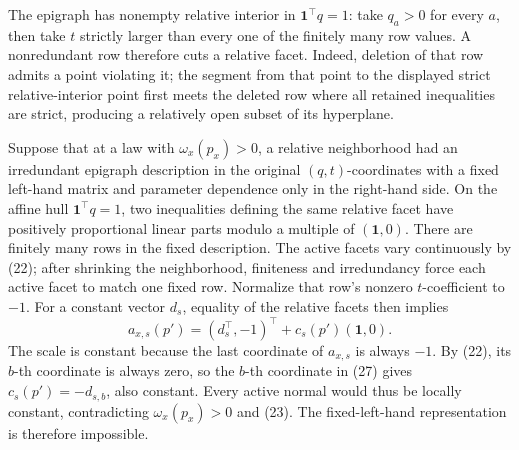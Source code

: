 The epigraph has nonempty relative interior in
\(\mathbf 1^\top q=1\): take \(q_a>0\) for every \(a\), then take \(t\)
strictly larger than every one of the finitely many row values.  A
nonredundant row therefore cuts a relative facet.  Indeed, deletion of that
row admits a point violating it; the segment from that point to the displayed
strict relative-interior point first meets the deleted row where all retained
inequalities are strict, producing a relatively open subset of its
hyperplane.

Suppose that at a law with \(\omega_x(p_x)>0\), a relative neighborhood had
an irredundant epigraph description in the original \((q,t)\)-coordinates
with a fixed left-hand matrix and parameter dependence only in the
right-hand side.  On the affine hull \(\mathbf 1^\top q=1\), two inequalities
defining the same relative facet have positively proportional linear parts
modulo a multiple of \((\mathbf 1,0)\).  There are finitely many rows in the
fixed description.  The active facets vary continuously by (22); after
shrinking the neighborhood, finiteness and irredundancy force each active
facet to match one fixed row.  Normalize that row's nonzero \(t\)-coefficient
to \(-1\).  For a constant vector \(d_s\), equality of the relative facets
then implies
\[
 a_{x,s}(p')=(d_s^\top,-1)^\top+c_s(p')(\mathbf 1,0).
 \tag{27}
\]
The scale is constant because the last coordinate of \(a_{x,s}\) is always
\(-1\).  By (22), its \(b\)-th coordinate is always zero, so the \(b\)-th
coordinate in (27) gives \(c_s(p')=-d_{s,b}\), also constant.  Every active
normal would thus be locally constant, contradicting
\(\omega_x(p_x)>0\) and (23).  The fixed-left-hand representation is
therefore impossible.

